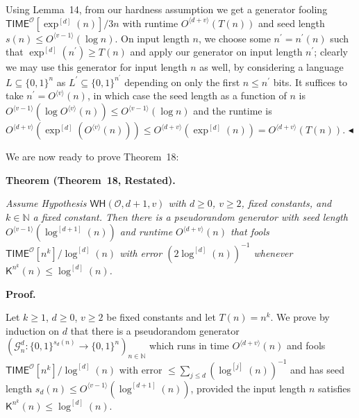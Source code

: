 \documentclass[10pt,a4paper]{article}
\begin{document}
Using Lemma 14, from our hardness assumption we get a generator fooling
${\mathsf{TIME}}^{\mathcal{O}}[\exp^{[d]}(n)]/3n$ with runtime $O^{\langle d+v\rangle}(T(n))$ and seed length $s(n)\leq O^{\langle v-1\rangle}(\log n)$.
On input length $n$, we choose some $n^{\prime}=n^{\prime}(n)$ such that $\exp^{[d]}(n^{\prime})\geq T(n)$ and apply our generator on input length $n^{\prime}$; clearly we may use this generator for input length $n$ as well, by considering a language $L\subseteq\{0,1\}^{n}$ as $L^{\prime}\subseteq\{0,1\}^{n^{\prime}}$ depending on only the first $n\leq n^{\prime}$ bits. It suffices to take $n^{\prime}=O^{\langle v\rangle}(n)$, in which case the seed length as a function of $n$ is $O^{\langle v-1\rangle}(\log O^{\langle v\rangle}(n))\leq O^{\langle v-1\rangle}(\log n)$ and the runtime is $O^{\langle d+v\rangle}(\exp^{[d]}(O^{\langle v\rangle}(n)))\leq O^{\langle d+v\rangle}(\exp^{[d]}(n))=O^{\langle d+v\rangle}(T(n))$.
$\blacktriangleleft$\par




We are now ready to prove Theorem 18:\par





\par\medskip\noindent\textbf{
\textbf{Theorem}\textbf{ }(Theorem 18, Restated)\textbf{.}
}\par



\emph{Assume Hypothesis $\mathsf{WH}(\mathcal{O},d+1,v)$ with $d\geq 0$, $v\geq 2$, fixed constants, and $k\in\mathbb{N}$ a fixed constant. Then there is a pseudorandom generator with seed length $O^{\langle v-1\rangle}(\log^{[d+1]}(n))$ and runtime $O^{\langle d+v\rangle}(n)$ that fools ${\mathsf{TIME}}^{\mathcal{O}}[n^{k}]/\log^{[d]}(n)$ with error $(2\log^{[d]}(n))^{-1}$ whenever ${\mathsf{K}}^{n^{k}}(n)\leq\log^{[d]}(n)$.}\par







\par\medskip\noindent\textbf{Proof.}\par




Let $k\geq 1$, $d\geq 0$, $v\geq 2$ be fixed constants and let $T(n)=n^{k}$.
We prove by induction on $d$ that there is a pseudorandom generator $(\mathcal{G}^{d}_{n}:\{0,1\}^{s_{d}(n)}\to\{0,1\}^{n})_{n\in\mathbb{N}}$ which runs in time $O^{\langle d+v\rangle}(n)$ and fools ${\mathsf{TIME}}^{\mathcal{O}}[n^{k}]/\log^{[d]}(n)$ with error $\leq\sum_{j\leq d}(\log^{[j]}(n))^{-1}$ and has seed length $s_{d}(n)\leq O^{\langle v-1\rangle}(\log^{[d+1]}(n))$, provided the input length $n$ satisfies ${\mathsf{K}}^{n^{k}}(n)\leq\log^{[d]}(n)$.\par
\end{document}
